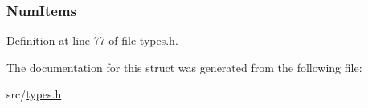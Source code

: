 \subsubsection[{Num\+Items}]{ Num\+Items}\label{struct_s_m_s___queque___type_def_a84d6da72470ad7fca2b7482887203f3e}


Definition at line 77 of file types.\+h.



The documentation for this struct was generated from the following file\+:\begin{DoxyCompactItemize}
\item 
src/\hyperlink{types_8h}{types.\+h}\end{DoxyCompactItemize}
